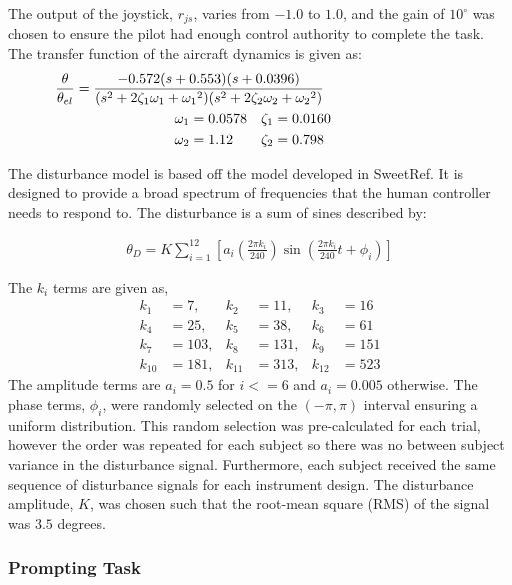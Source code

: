 The output of the joystick, $r_{js}$, varies from $-1.0$ to $1.0$, and the gain of $10^{\circ}$ was chosen to ensure the pilot had enough control authority to complete the task.
The transfer function of the aircraft dynamics is given as:
\begin{align}
    \mathclap{ %
        \frac{\theta}{\theta_{el}}
        =
        \frac{
            -0.572 (s+0.553) (s+0.0396)
        }{
            (s^2 + 2\zeta_1 \omega_1 + {\omega_1}^2)
            (s^2 + 2\zeta_2 \omega_2 + {\omega_2}^2)
        }
    }\\
    \omega_1 &= 0.0578 & \zeta_1 &= 0.0160 \nonumber \\
    \omega_2 &= 1.12 & \zeta_2 &= 0.798 \nonumber
\end{align}

The disturbance model is based off the model developed in SweetRef.
It is designed to provide a broad spectrum of frequencies that the human controller needs to respond to.
The disturbance is a sum of sines described by:

\begin{align}
    \theta_D = K\sum\limits_{i=1}^{12} \left[ a_i \left(\frac{2\pi k_i}{240} \right) \sin\left( \frac{2\pi k_i}{240}t + \phi_i \right) \right]
\end{align}

The $k_i$ terms are given as,
\begin{align*}
    k_1 &= 7, & k_2 &= 11, & k_3 &= 16 \\
    k_4 &= 25, & k_5 &= 38, & k_6 &= 61 \\
    k_7 &= 103, & k_8 &= 131, & k_9 &= 151 \\
    k_{10} &= 181, & k_{11} &= 313, & k_{12} &= 523
\end{align*}
The amplitude terms are $a_i=0.5$ for $i <= 6$ and $a_i=0.005$ otherwise.
The phase terms, $\phi_i$, were randomly selected on the $(-\pi, \pi)$ interval ensuring a uniform distribution.
This random selection was pre-calculated for each trial, however the order was repeated for each subject so there was no between subject variance in the disturbance signal.
Furthermore, each subject received the same sequence of disturbance signals for each instrument design.
The disturbance amplitude, $K$, was chosen such that the root-mean square (RMS) of the signal was $3.5$ degrees.

\subsubsection{Prompting Task}

